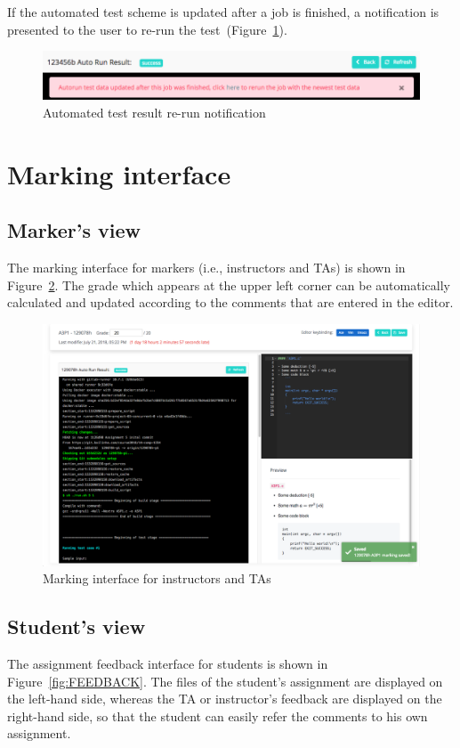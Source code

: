 If the automated test scheme is updated after a job is finished, a notification
is presented to the user to re-run the test~(Figure~\ref{fig:RERUN}).

\begin{figure}[H]
    \centering
        \includegraphics[width=1.0\textwidth]{figures/rerun}
    \caption{Automated test result re-run notification}
    \label{fig:RERUN}
\end{figure}

\section{Marking interface}
\subsection{Marker's view}
The marking interface for markers (i.e., instructors and TAs) is shown in
Figure~\ref{fig:MARKING}. The grade which appears at the upper left corner can
be automatically calculated and updated according to the comments that are
entered in the editor.

\begin{figure}[H]
    \centering
        \includegraphics[width=1.0\textwidth]{figures/marker}
    \caption{Marking interface for instructors and TAs}
    \label{fig:MARKING}
\end{figure}

\subsection{Student's view}
The assignment feedback interface for students is shown in
Figure~\ref{fig:FEEDBACK}.
The files of the student's assignment are displayed on the left-hand side,
whereas the TA or instructor's feedback are displayed on the right-hand side,
so that the student can easily refer the comments to his own assignment.

